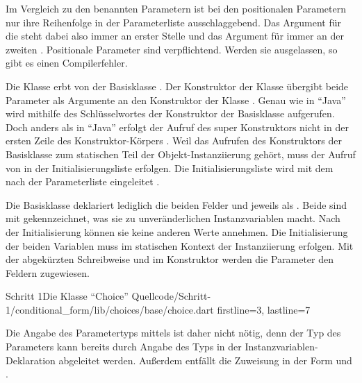 Im Vergleich zu den benannten Parametern ist bei den positionalen Parametern nur ihre Reihenfolge in der Parameterliste ausschlaggebend.
Das Argument für die  steht dabei also immer an erster Stelle und das Argument für  immer an der zweiten .
Positionale Parameter sind verpflichtend.
Werden sie ausgelassen, so gibt es einen Compilerfehler.

Die Klasse  erbt von der Basisklasse  .
Der Konstruktor der Klasse  übergibt beide Parameter als Argumente an den Konstruktor der Klasse .
Genau wie in \enquote{Java} wird mithilfe des Schlüsselwortes  der Konstruktor der Basisklasse aufgerufen.
Doch anders als in \enquote{Java} erfolgt der Aufruf des super Konstruktors nicht in der ersten Zeile des Konstruktor-Körpers .
Weil das Aufrufen des Konstruktors der Basisklasse zum statischen Teil der Objekt-Instanziierung gehört, muss der Aufruf von  in der Initialisierungsliste erfolgen.
Die Initialisierungsliste wird mit dem \IC{:} nach der Parameterliste eingeleitet .

Die Basisklasse  \Lst{\ref{lst:Schritt1KlasseChoice}} deklariert lediglich die beiden Felder  und  jeweils als  .
Beide sind mit  gekennzeichnet, was sie zu unveränderlichen Instanzvariablen macht.
Nach der Initialisierung können sie keine anderen Werte annehmen.
 Die Initialisierung der beiden Variablen muss im statischen Kontext der Instanziierung erfolgen.
Mit der abgekürzten Schreibweise  und   im Konstruktor  werden die Parameter den Feldern zugewiesen.

\begin{alexlisting}{Schritt 1}{Die Klasse \enquote{Choice}}
  {Quellcode/Schritt-1/conditional_form/lib/choices/base/choice.dart}
  {firstline=3, lastline=7}
  \label{lst:Schritt1KlasseChoice}
\end{alexlisting}

Die Angabe des Parametertyps mittels  ist daher nicht nötig,
denn der Typ des Parameters kann bereits durch Angabe des Typs in der Instanzvariablen-Deklaration  abgeleitet werden.
Außerdem entfällt die Zuweisung in der Form  und
. 

